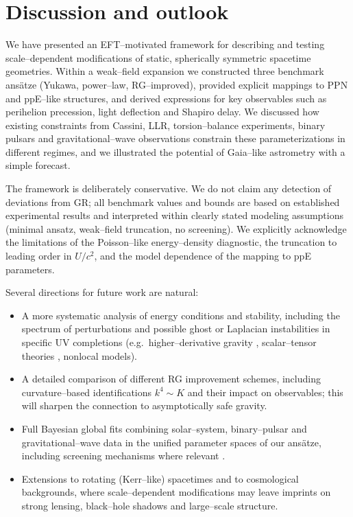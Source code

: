 \documentclass[11pt,a4paper]{article}
\begin{document}
\section{Discussion and outlook}
\label{sec:discussion}

We have presented an EFT--motivated framework for describing and testing scale--dependent modifications of static, spherically symmetric spacetime geometries. Within a weak--field expansion we constructed three benchmark ans\"atze (Yukawa, power--law, RG--improved), provided explicit mappings to PPN and ppE--like structures, and derived expressions for key observables such as perihelion precession, light deflection and Shapiro delay. We discussed how existing constraints from Cassini, LLR, torsion--balance experiments, binary pulsars and gravitational--wave observations constrain these parameterizations in different regimes, and we illustrated the potential of Gaia--like astrometry with a simple forecast.

The framework is deliberately conservative. We do not claim any detection of deviations from GR; all benchmark values and bounds are based on established experimental results and interpreted within clearly stated modeling assumptions (minimal ansatz, weak--field truncation, no screening). We explicitly acknowledge the limitations of the Poisson--like energy--density diagnostic, the truncation to leading order in $U/c^2$, and the model dependence of the mapping to ppE parameters.

Several directions for future work are natural:
\begin{itemize}[leftmargin=*]
\item A more systematic analysis of energy conditions and stability, including the spectrum of perturbations and possible ghost or Laplacian instabilities in specific UV completions (e.g.\ higher--derivative gravity \cite{Stelle1978,Accioly2003}, scalar--tensor theories \cite{Freire2012}, nonlocal models).
\item A detailed comparison of different RG improvement schemes, including curvature--based identifications $k^4\sim K$ and their impact on observables; this will sharpen the connection to asymptotically safe gravity.
\item Full Bayesian global fits combining solar--system, binary--pulsar and gravitational--wave data in the unified parameter spaces of our ans\"atze, including screening mechanisms where relevant \cite{Clifton2012,Joyce2015}.
\item Extensions to rotating (Kerr--like) spacetimes and to cosmological backgrounds, where scale--dependent modifications may leave imprints on strong lensing, black--hole shadows and large--scale structure.
\end{itemize}
\end{document}

